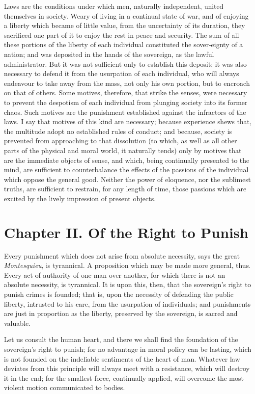 Laws are the conditions under which men, naturally independent, united
themselves in society. Weary of living in a continual state of war,
and of enjoying a liberty which became of little value, from the
uncertainty of its duration, they sacrificed one part of it to enjoy
the rest in peace and security. The sum of all these portions of the
liberty of each individual constituted the sover-eignty of a
nation; and was deposited in the hands of the sovereign, as the lawful
administrator. But it was not sufficient only to establish this
deposit; it was also necessary to defend it from the usurpation of
each individual, who will always endeavour to take away from the mass,
not only his own portion, but to encroach on that of others. Some
motives, therefore, that strike the senses, were necessary to prevent
the despotism of each individual from plunging society into its former
chaos. Such motives are the punishment established against the
infractors of the laws. I say that motives of this kind are necessary;
because experience shews that, the multitude adopt no established
rules of conduct; and because, society is prevented from approaching
to that dissolution (to which, as well as all other parts of the
physical and moral world, it naturally tends) only by motives that are
the immediate objects of sense, and which, being continually presented
to the mind, are sufficient to counterbalance the effects of the
passions of the individual which oppose the general good. Neither the
power of eloquence, nor the sublimest truths, are sufficient to
restrain, for any length of time, those passions which are excited by
the lively impression of present objects.

\section{Chapter II. Of the Right to Punish}

Every punishment which does not arise from absolute necessity, says
the great \textit{Montesquieu}, is tyrannical. A proposition which may
be made more general, thus. Every act of authority of one man over
another, for which there is not an absolute necessity, is tyrannical.
It is upon this, then, that the sovereign's right to punish crimes is
founded; that is, upon the necessity of defending the public liberty,
intrusted to his care, from the usurpation of individuals; and
punishments are just in proportion as the liberty, preserved by the
sovereign, is sacred and valuable.

Let us consult the human heart, and there we shall find the foundation
of the sovereign's right to punish; for no advantage in moral policy
can be lasting, which is not founded on the indeliable sentiments of
the heart of man. Whatever law deviates from this principle will
always meet with a resistance, which will destroy it in the end; for
the smallest force, continually applied,  will overcome the
most violent motion communicated to bodies.

